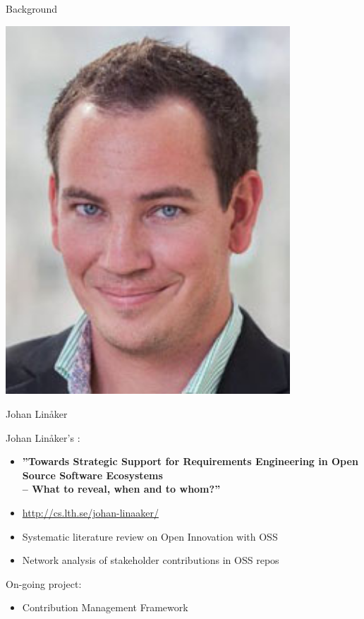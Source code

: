 \documentclass{slideclass}
\begin{document}
\begin{Slide}{Background}\SlideFontSmall
\begin{minipage}{0.29\textwidth}
\includegraphics[width=0.8\textwidth]{img/Johan_Linaker_197}

\footnotesize Johan Linåker
\end{minipage}
\begin{minipage}{0.65\textwidth}
Johan Linåker's :
\begin{itemize}
\item \textbf{''Towards Strategic Support for
Requirements Engineering in Open
Source Software Ecosystems
\\-- What to reveal, when and to whom?''}
\item[] \url{http://cs.lth.se/johan-linaaker/}
\item Systematic literature review on Open Innovation with OSS
\item Network analysis of stakeholder contributions in OSS repos

\end{itemize}
On-going  project:
\begin{itemize}
\item Contribution Management Framework
\end{itemize}
\end{minipage}
{}
\end{Slide}
\end{document}
